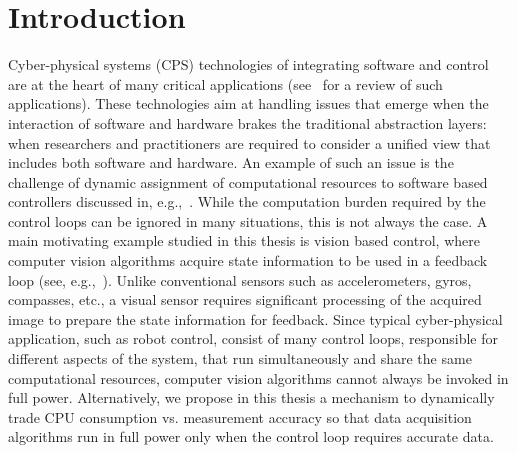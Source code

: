 \documentclass[ twoside, 12pt ]{article}
\begin{document}
\begin{titlepage}
    \hspace{3cm}
\end{titlepage}

\newpage
{}


\newpage
{}


\newpage
\tableofcontents
\newpage
\listoffigures
\newpage



\section{Introduction} %
Cyber-physical systems (CPS) technologies of integrating software and control are at the heart of many critical applications (see~\cite{lee2008cyber} for a review of such applications). 
These technologies aim at handling issues that emerge when the interaction of software and hardware brakes the traditional abstraction layers: when researchers and practitioners are required to consider a unified view that includes both software and hardware. An example of such an issue is the challenge of dynamic assignment of computational resources to software based controllers discussed in, e.g.,~\cite{arzen2000introduction,tabuada2007event,weiss2007automata}. While the computation burden required by the control loops can be ignored in many situations, this is not always the case. A main motivating example studied in this thesis is vision based control, where computer vision algorithms acquire state information to be used in a feedback loop (see, e.g.,~\cite{das2002vision,shakernia1999landing,Efraim2017}). Unlike conventional sensors such as accelerometers, gyros, compasses, etc., a visual sensor requires significant processing of the acquired image to prepare the state information for feedback. Since typical cyber-physical application, such as robot control, consist of many control loops, responsible for different aspects of the system, that run simultaneously and share the same computational resources, computer vision algorithms cannot always be invoked in full power. Alternatively, we propose in this thesis a mechanism to dynamically trade CPU consumption vs. measurement accuracy so that data acquisition algorithms run in full power only when the control loop requires accurate data. 
\end{document}
